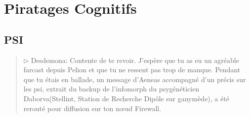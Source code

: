 \chapter{Piratages Cognitifs} \label{cha:mind-hacks} 













\section{PSI} 

\begin{quotation} 

$\triangleright $ Desdemona: Contente de te revoir. J'espère que tu as eu un agréable farcast depuis Pelion et que tu ne ressent pas trop de manque. Pendant que tu étais en ballade, un message d'Aeneas accompagné d'un précis sur les psi, extrait du backup de l'infomorph du psygénéticien Daborva(Stellint, Station de Recherche Dipôle sur ganymède), a été rerouté pour diffusion sur ton nœud Firewall. \end{quotation} 

